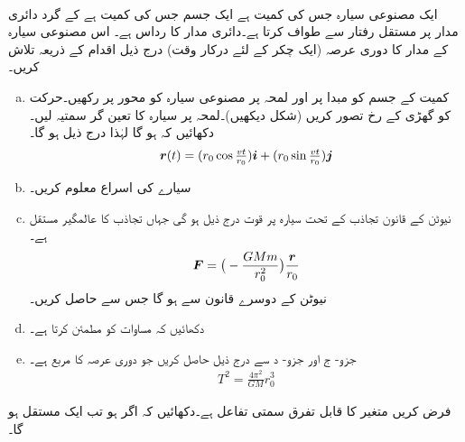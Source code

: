 \\
ایک مصنوعی سیارہ جس کی کمیت  ہے ایک جسم جس کی کمیت  ہے کے گرد دائری مدار  پر  مستقل رفتار  سے  طواف کرتا ہے۔دائری مدار کا رداس  ہے۔ اس مصنوعی سیارہ کے مدار کا    دوری عرصہ   (ایک چکر کے لئے درکار وقت)   درج ذیل اقدام کے ذریعہ تلاش کریں۔
\begin{enumerate}[a.]
\item
کمیت  کے جسم کو مبدا پر   اور لمحہ  پر   مصنوعی سیارہ کو محور   پر رکھیں۔حرکت کو گھڑی کے رخ تصور کریں (شکل دیکھیں)۔لمحہ  پر سیارہ کا تعین گر سمتیہ  لیں۔ دکھائیں کہ  ہو گا  لہٰذا درج ذیل  ہو گا۔
\begin{align*}
{\ensuremath{{\boldsymbol{r}}}}(t)=(r_0\cos\tfrac{vt}{r_0}){\boldsymbol{i}}+(r_0\sin\tfrac{vt}{r_0}){\boldsymbol{j}}
\end{align*}
\item
سیارے کی اسراع معلوم کریں۔
\item
نیوٹن کے قانون تجاذب  کے تحت سیارہ پر قوت درج ذیل ہو گی جہاں   تجاذب کا عالمگیر مستقل ہے۔
\begin{align*}
{\ensuremath{{\boldsymbol{F}}}}=\big(-\frac{GMm}{r_0^2}\big)\frac{{{\boldsymbol{r}}}}{r_0}
\end{align*}
نیوٹن کے دوسرے قانون سے  ہو گا  جس سے  حاصل کریں۔ 
\item
دکھائیں کہ مساوات  کو مطمئن کرتا ہے۔
\item
جزو- ج اور جزو- د سے درج ذیل حاصل کریں جو دوری عرصہ کا مربع ہے۔
\begin{align*}
T^2=\frac{4\pi^2}{GM}r_0^3
\end{align*}
\end{enumerate}
%
\begin{center}
\end{center}
فرض کریں  متغیر  کا قابل تفرق سمتی تفاعل ہے۔دکھائیں کہ اگر  ہو تب  ایک مستقل ہو گا۔
